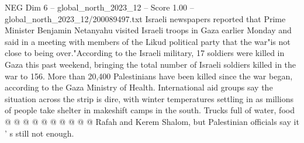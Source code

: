 \begin{textsample}{NEG Dim 6 – global\_north\_2023\_12 – Score 1.00 – global\_north\_2023\_12/200089497.txt}
Israeli newspapers reported that Prime Minister Benjamin Netanyahu visited Israeli troops in Gaza earlier Monday and said in a meeting with members of the Likud political party that the war"is not close to being over."According to the Israeli military, 17 soldiers were killed in Gaza this past weekend, bringing the total number of Israeli soldiers killed in the war to 156.
More than 20,400 Palestinians have been killed since the war began, according to the Gaza Ministry of Health.
International aid groups say the situation across the strip is dire, with winter temperatures settling in as millions of people take shelter in makeshift camps in the south.
Trucks full of water, food @ @ @ @ @ @ @ @ @ @ Rafah and Kerem Shalom, but Palestinian officials say it ' s still not enough.

\end{textsample}
